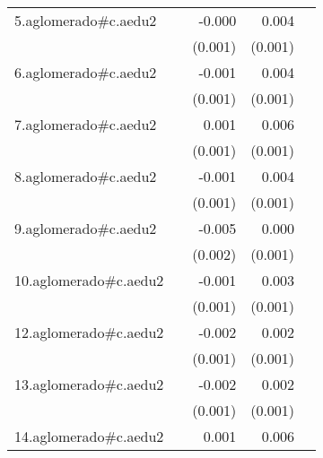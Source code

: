 {\begin{longtable}{l*{4}{D{.}{.}{-1}}}
\addlinespace
5.aglomerado#c.aedu2&                     &      -0.000         &       0.004\sym{***}&                     \\
            &                     &     (0.001)         &     (0.001)         &                     \\
\addlinespace
6.aglomerado#c.aedu2&                     &      -0.001         &       0.004\sym{***}&                     \\
            &                     &     (0.001)         &     (0.001)         &                     \\
\addlinespace
7.aglomerado#c.aedu2&                     &       0.001         &       0.006\sym{***}&                     \\
            &                     &     (0.001)         &     (0.001)         &                     \\
\addlinespace
8.aglomerado#c.aedu2&                     &      -0.001         &       0.004\sym{***}&                     \\
            &                     &     (0.001)         &     (0.001)         &                     \\
\addlinespace
9.aglomerado#c.aedu2&                     &      -0.005\sym{**} &       0.000         &                     \\
            &                     &     (0.002)         &     (0.001)         &                     \\
\addlinespace
10.aglomerado#c.aedu2&                     &      -0.001         &       0.003\sym{***}&                     \\
            &                     &     (0.001)         &     (0.001)         &                     \\
\addlinespace
12.aglomerado#c.aedu2&                     &      -0.002         &       0.002\sym{*}  &                     \\
            &                     &     (0.001)         &     (0.001)         &                     \\
\addlinespace
13.aglomerado#c.aedu2&                     &      -0.002\sym{*}  &       0.002\sym{***}&                     \\
            &                     &     (0.001)         &     (0.001)         &                     \\
\addlinespace
14.aglomerado#c.aedu2&                     &       0.001         &       0.006\sym{***}&                     \\

\end{longtable}}
